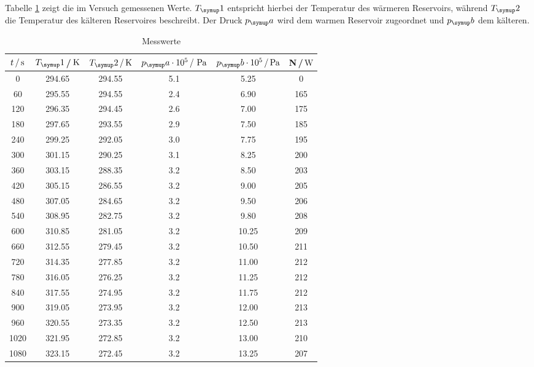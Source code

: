 Tabelle \ref{tab:messwerte} zeigt die im Versuch gemessenen Werte.
$T_\su{1}$ entspricht hierbei der Temperatur des wärmeren Reservoirs, während $T_\su{2}$
die Temperatur des kälteren Reservoires beschreibt. Der Druck $p_\su{a}$ wird dem warmen Reservoir
zugeordnet und $p_\su{b}$ dem kälteren.
\begin{table}[h]
  \centering
  \begin{tabular}{c c c c c c}
    \toprule
    $t\,/\,\si{\second}$ &$T_\su{1}$\,/$\,\si{\kelvin}$ & $T_\su{2}\,/\Kel$ & $p_\su{a}\cdot 10^5\,/\,\pas $ &
    $p_\su{b}\cdot 10^5\,/ \pas$ & N\,/$\,\si{\watt}$  \\
    \midrule
       0   &   294.65   &   294.55   &   5.1    &     5.25   &      0 \\
      60   &   295.55   &   294.55   &   2.4    &     6.90   &    165 \\
     120   &   296.35   &   294.45   &   2.6    &     7.00   &    175 \\
     180   &   297.65   &   293.55   &   2.9    &     7.50   &    185 \\
     240   &   299.25   &   292.05   &   3.0    &     7.75   &    195 \\
     300   &   301.15   &   290.25   &   3.1    &     8.25   &    200 \\
     360   &   303.15   &   288.35   &   3.2    &     8.50   &    203 \\
     420   &   305.15   &   286.55   &   3.2    &     9.00   &    205 \\
     480   &   307.05   &   284.65   &   3.2    &     9.50   &    206 \\
     540   &   308.95   &   282.75   &   3.2    &     9.80   &    208 \\
     600   &   310.85   &   281.05   &   3.2    &    10.25   &    209 \\
     660   &   312.55   &   279.45   &   3.2    &    10.50   &    211 \\
     720   &   314.35   &   277.85   &   3.2    &    11.00   &    212 \\
     780   &   316.05   &   276.25   &   3.2    &    11.25   &    212 \\
     840   &   317.55   &   274.95   &   3.2    &    11.75   &    212 \\
     900   &   319.05   &   273.95   &   3.2    &    12.00   &    213 \\
     960   &   320.55   &   273.35   &   3.2    &    12.50   &    213 \\
    1020   &   321.95   &   272.85   &   3.2    &    13.00   &    210 \\
    1080   &   323.15   &   272.45   &   3.2    &    13.25   &    207 \\
    \bottomrule
  \end{tabular}
  \caption{Messwerte}
  \label{tab:messwerte}
\end{table}
